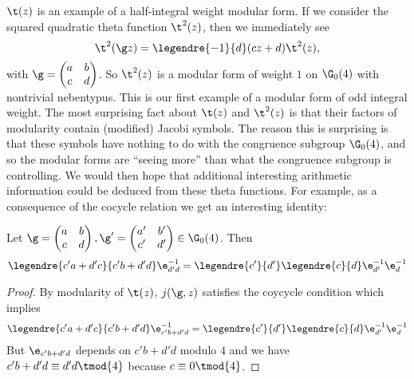      $\t(z)$ is an example of a half-integral weight modular form. If we consider the squared quadratic theta function $\t^{2}(z)$, then we immediately see
      \[
        \t^{2}(\g z) = \legendre{-1}{d}(cz+d)\t^{2}(z),
      \]
      with $\g = \begin{pmatrix} a & b \\ c & d \end{pmatrix}$. So $\t^{2}(z)$ is a modular form of weight $1$ on $\G_{0}(4)$ with nontrivial nebentypus. This is our first example of a modular form of odd integral weight. The most surprising fact about $\t(z)$ and $\t^{2}(z)$ is that their factors of modularity contain (modified) Jacobi symbols. The reason this is surprising is that these symbols have nothing to do with the congruence subgroup $\G_{0}(4)$, and so the modular forms are ``seeing more'' than what the congruence subgroup is controlling. We would then hope that additional interesting arithmetic information could be deduced from these theta functions. For example, as a consequence of the cocycle relation we get an interesting identity:

      \begin{corollary}
        Let $\g = \begin{pmatrix} a & b \\ c & d \end{pmatrix},\g' = \begin{pmatrix} a' & b' \\ c' & d' \end{pmatrix} \in \G_{0}(4)$. Then
        \[
          \legendre{c'a+d'c}{c'b+d'd}\e_{d'd}^{-1} = \legendre{c'}{d'}\legendre{c}{d}\e_{d'}^{-1}\e_{d}^{-1}
        \]
      \end{corollary}
      \begin{proof}
        By modularity of $\t(z)$, $j(\g,z)$ satisfies the coycycle condition which implies
        \[
          \legendre{c'a+d'c}{c'b+d'd}\e_{c'b+d'd}^{-1} = \legendre{c'}{d'}\legendre{c}{d}\e_{d'}^{-1}\e_{d}^{-1}
        \]
        But $\e_{c'b+d'd}$ depends on $c'b+d'd$ modulo $4$ and we have $c'b+d'd \equiv d'd \tmod{4}$ because $c \equiv 0 \tmod{4}$.
      \end{proof}
